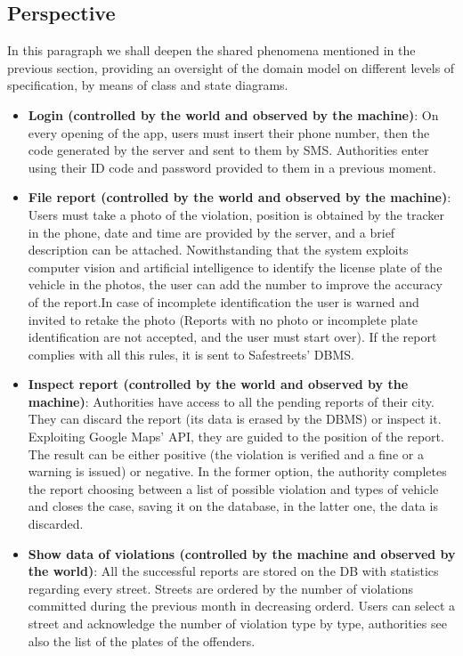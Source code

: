 \subsection {Perspective}

In this paragraph we shall deepen the shared phenomena mentioned in the previous section, providing an oversight of the domain model on different levels of specification, by means of class and state diagrams.

\begin{itemize}

\item \textbf{Login (controlled by the world and observed by the machine)}: On every opening of the app, users must insert their phone number, then the code generated by the server and sent to them by SMS. Authorities enter using their ID code and password provided to them in a previous moment.

\item \textbf{File report (controlled by the world and observed by the machine)}: Users must take a photo of the violation, position is obtained by the tracker in the phone, date and time are provided by the server, and a brief description can be attached. Nowithstanding that the system exploits computer vision and artificial intelligence to identify the license plate of the vehicle in the photos, the user can add the number to improve the accuracy of the report.In case of incomplete identification the user is warned and invited to retake the photo (Reports with no photo or incomplete plate identification are not accepted, and the user must start over). If the report complies with all this rules, it is sent to Safestreets' DBMS.

\item \textbf{Inspect report (controlled by the world and observed by the machine)}: Authorities have access to all the pending reports of their city. They can discard the report (its data is erased by the DBMS) or inspect it. Exploiting Google Maps' API, they are guided to the position of the report. The result can be either positive (the violation is verified and a fine or a warning is issued) or negative. In the former option, the authority completes the report choosing between a list of possible violation and types of vehicle and closes the case, saving it on the database, in the latter one, the data is discarded.

\item \textbf{Show data of violations (controlled by the machine and observed by the world)}: All the successful reports are stored on the DB with statistics regarding every street. Streets are ordered by the number of violations committed during the previous month in decreasing orderd. Users can select a street and acknowledge the number of violation type by type, authorities see also the list of the plates of the offenders.


\end{itemize}
